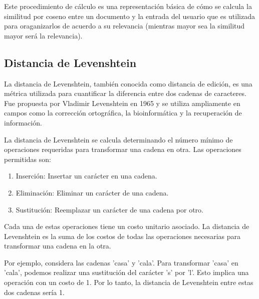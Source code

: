 \documentclass[a4paper, 12pt]{article}
\begin{document}
Este procedimiento de cálculo es una representación básica de cómo se calcula la similitud por coseno entre un documento y la entrada del usuario que es utilizada para oraganizarlos de acuerdo a su relevancia (mientras mayor sea la similitud mayor será la relevancia).

\subsection{Distancia de Levenshtein}
La distancia de Levenshtein, también conocida como distancia de edición, es una métrica utilizada para cuantificar la diferencia entre dos cadenas de caracteres. Fue propuesta por Vladimir Levenshtein en 1965 y se utiliza ampliamente en campos como la corrección ortográfica, la bioinformática y la recuperación de información.

La distancia de Levenshtein se calcula determinando el número mínimo de operaciones requeridas para transformar una cadena en otra. Las operaciones permitidas son:
\begin{enumerate}

\item Inserción: Insertar un carácter en una cadena.
\item Eliminación: Eliminar un carácter de una cadena.
\item Sustitución: Reemplazar un carácter de una cadena por otro.
\end{enumerate}
Cada una de estas operaciones tiene un costo unitario asociado. La distancia de Levenshtein es la suma de los costos de todas las operaciones necesarias para transformar una cadena en la otra.

Por ejemplo, considera las cadenas 'casa' y 'cala'. Para transformar 'casa' en 'cala', podemos realizar una sustitución del carácter 's' por 'l'. Esto implica una operación con un costo de 1. Por lo tanto, la distancia de Levenshtein entre estas dos cadenas sería 1.
\end{document}
